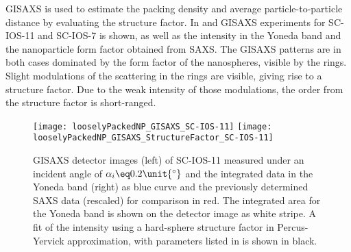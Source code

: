 \documentclass[\main/dresen_thesis.tex]{subfiles}
\begin{document}
  \label{sec:looselyPackedNS:layers:gisaxs}
  GISAXS is used to estimate the packing density and average particle-to-particle distance by evaluating the structure factor.
  In  and  GISAXS experiments for SC-IOS-11 and SC-IOS-7 is shown, as well as the intensity in the Yoneda band and the nanoparticle form factor obtained from SAXS.
  The GISAXS patterns are in both cases dominated by the form factor of the nanospheres, visible by the rings.
  Slight modulations of the scattering in the rings are visible, giving rise to a structure factor.
  Due to the weak intensity of those modulations, the order from the structure factor is short-ranged.
  \begin{figure}[tb]
    \centering
    \texttt{[image: looselyPackedNP\_GISAXS\_SC-IOS-11]}
    \texttt{[image: looselyPackedNP\_GISAXS\_StructureFactor\_SC-IOS-11]}
    \caption{\label{fig:looselyPackedNP:layer:gisaxsSC_IOS_11}GISAXS detector images (left) of SC-IOS-11 measured under an incident angle of $\alpha_i \eq 0.2 \unit{^\circ}$ and the integrated data in the Yoneda band (right) as blue curve and the previously determined SAXS data (rescaled) for comparison in red. The integrated area for the Yoneda band is shown on the detector image as white stripe. A fit of the intensity using a hard-sphere structure factor in Percus-Yervick approximation, with parameters listed in  is shown in black.}
  \end{figure}
\end{document}
